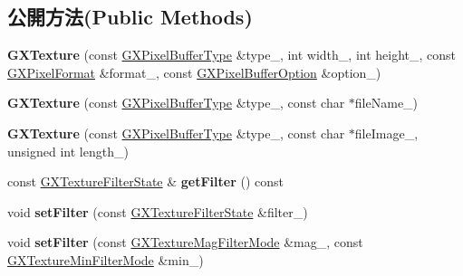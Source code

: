 \subsection*{公開方法(Public Methods)}
\begin{DoxyCompactItemize}
\item 
{\bfseries G\+X\+Texture} (const \hyperlink{class_i_dream_sky_1_1_g_x_pixel_buffer_type}{G\+X\+Pixel\+Buffer\+Type} \&type\+\_\+, int width\+\_\+, int height\+\_\+, const \hyperlink{class_i_dream_sky_1_1_g_x_pixel_format}{G\+X\+Pixel\+Format} \&format\+\_\+, const \hyperlink{class_i_dream_sky_1_1_g_x_pixel_buffer_option}{G\+X\+Pixel\+Buffer\+Option} \&option\+\_\+)\hypertarget{class_i_dream_sky_1_1_g_x_texture_ac71b7bf644cc587e2eeb30720365fb50}{}\label{class_i_dream_sky_1_1_g_x_texture_ac71b7bf644cc587e2eeb30720365fb50}

\item 
{\bfseries G\+X\+Texture} (const \hyperlink{class_i_dream_sky_1_1_g_x_pixel_buffer_type}{G\+X\+Pixel\+Buffer\+Type} \&type\+\_\+, const char $\ast$file\+Name\+\_\+)\hypertarget{class_i_dream_sky_1_1_g_x_texture_a15b2ed9511c21d54181cfffdc06b51b4}{}\label{class_i_dream_sky_1_1_g_x_texture_a15b2ed9511c21d54181cfffdc06b51b4}

\item 
{\bfseries G\+X\+Texture} (const \hyperlink{class_i_dream_sky_1_1_g_x_pixel_buffer_type}{G\+X\+Pixel\+Buffer\+Type} \&type\+\_\+, const char $\ast$file\+Image\+\_\+, unsigned int length\+\_\+)\hypertarget{class_i_dream_sky_1_1_g_x_texture_aad4a0297c63302975ce8bc36e0c44f7f}{}\label{class_i_dream_sky_1_1_g_x_texture_aad4a0297c63302975ce8bc36e0c44f7f}

\item 
const \hyperlink{class_i_dream_sky_1_1_g_x_texture_filter_state}{G\+X\+Texture\+Filter\+State} \& {\bfseries get\+Filter} () const \hypertarget{class_i_dream_sky_1_1_g_x_texture_a2aee96ff1130b727139212b469388211}{}\label{class_i_dream_sky_1_1_g_x_texture_a2aee96ff1130b727139212b469388211}

\item 
void {\bfseries set\+Filter} (const \hyperlink{class_i_dream_sky_1_1_g_x_texture_filter_state}{G\+X\+Texture\+Filter\+State} \&filter\+\_\+)\hypertarget{class_i_dream_sky_1_1_g_x_texture_ac12240c8cbe3f0d43ca0c3c880184de8}{}\label{class_i_dream_sky_1_1_g_x_texture_ac12240c8cbe3f0d43ca0c3c880184de8}

\item 
void {\bfseries set\+Filter} (const \hyperlink{class_i_dream_sky_1_1_g_x_texture_mag_filter_mode}{G\+X\+Texture\+Mag\+Filter\+Mode} \&mag\+\_\+, const \hyperlink{class_i_dream_sky_1_1_g_x_texture_min_filter_mode}{G\+X\+Texture\+Min\+Filter\+Mode} \&min\+\_\+)\hypertarget{class_i_dream_sky_1_1_g_x_texture_a111f659ac93966b8b0eff4814e749012}{}\label{class_i_dream_sky_1_1_g_x_texture_a111f659ac93966b8b0eff4814e749012}


\end{DoxyCompactItemize}
